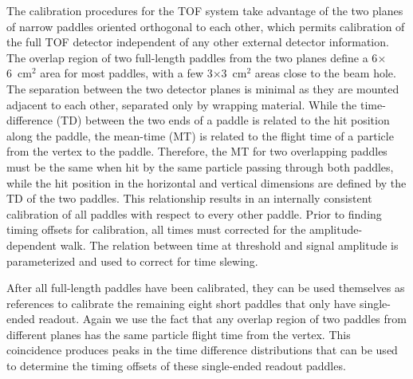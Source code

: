 The calibration procedures for the TOF system take advantage of the two
planes of narrow paddles oriented orthogonal to each other, which permits calibration of the full TOF detector independent
of any other external detector information. The overlap region of two full-length paddles from the two planes define
a 6$\times$6~cm$^2$ area for most paddles, with a few 3$\times$3~cm$^2$ areas close to the beam hole. The separation between the two detector planes is minimal as they are mounted adjacent to each other, separated only by wrapping
material. While the time-difference (TD) between the two ends of a paddle is related to the hit position along the paddle,
the mean-time (MT) is related to the flight time of a particle from the vertex to the paddle. Therefore, the MT for two overlapping
paddles must be the same when hit by the same particle passing through both paddles, while the hit position in the horizontal and vertical dimensions are defined by the TD of the two paddles. This relationship results in an internally consistent calibration of all paddles with respect to every other paddle. Prior to finding timing offsets for calibration, all times must corrected for the amplitude-dependent walk. The relation between time at threshold and signal amplitude is parameterized and used to correct for time slewing.

After all full-length paddles have been calibrated, they can be used themselves as references to
calibrate the remaining eight short paddles that only have single-ended readout.  Again we use the fact that any overlap region of two paddles from different
planes has the same particle flight time from the vertex. This coincidence produces peaks in the time difference distributions that can be used to determine the timing offsets of these single-ended readout paddles. 

